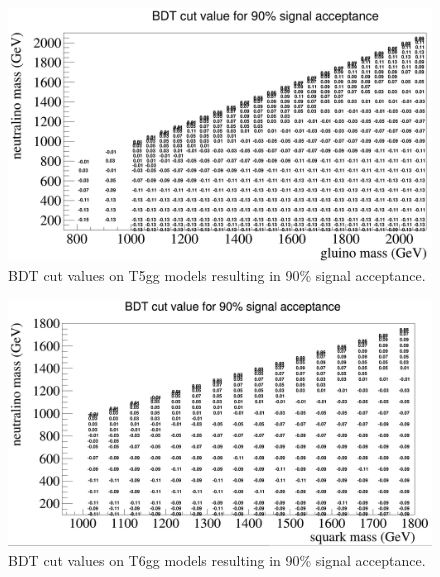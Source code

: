 \begin{figure}[h]
	\centering
	\includegraphics[width=1.5\linewidth,angle=90]{Figures/T5Wg_bdtcuts}
	\caption[BDT cut values on T5gg models resulting in 90\% signal acceptance.]{BDT cut values on T5gg models resulting in 90\% signal acceptance.}
	\label{fig:t5wgbdtcuts}
\end{figure}
\begin{figure}[h]
	\centering
	\includegraphics[width=1.5\linewidth, angle=90]{Figures/T6Wg_bdtcuts}
	\caption[BDT cut values on T6gg models resulting in 90\% signal acceptance.]{BDT cut values on T6gg models resulting in 90\% signal acceptance.}
	\label{fig:t6wgbdtcuts}
\end{figure}

